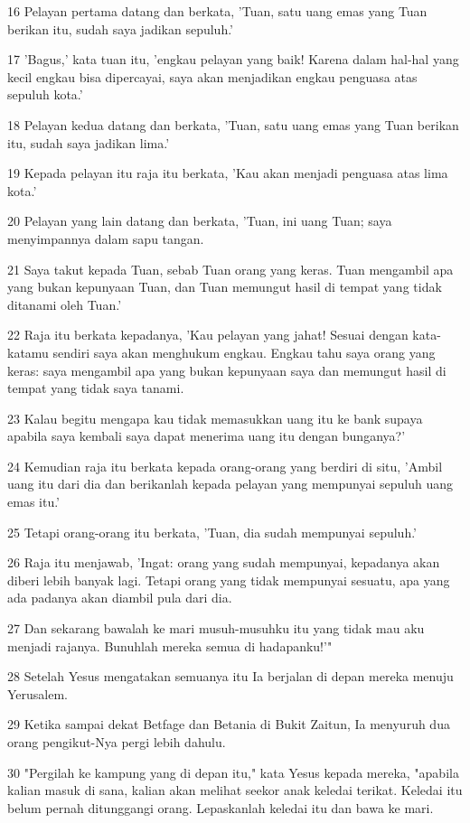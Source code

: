 \par 16 Pelayan pertama datang dan berkata, 'Tuan, satu uang emas yang Tuan berikan itu, sudah saya jadikan sepuluh.'
\par 17 'Bagus,' kata tuan itu, 'engkau pelayan yang baik! Karena dalam hal-hal yang kecil engkau bisa dipercayai, saya akan menjadikan engkau penguasa atas sepuluh kota.'
\par 18 Pelayan kedua datang dan berkata, 'Tuan, satu uang emas yang Tuan berikan itu, sudah saya jadikan lima.'
\par 19 Kepada pelayan itu raja itu berkata, 'Kau akan menjadi penguasa atas lima kota.'
\par 20 Pelayan yang lain datang dan berkata, 'Tuan, ini uang Tuan; saya menyimpannya dalam sapu tangan.
\par 21 Saya takut kepada Tuan, sebab Tuan orang yang keras. Tuan mengambil apa yang bukan kepunyaan Tuan, dan Tuan memungut hasil di tempat yang tidak ditanami oleh Tuan.'
\par 22 Raja itu berkata kepadanya, 'Kau pelayan yang jahat! Sesuai dengan kata-katamu sendiri saya akan menghukum engkau. Engkau tahu saya orang yang keras: saya mengambil apa yang bukan kepunyaan saya dan memungut hasil di tempat yang tidak saya tanami.
\par 23 Kalau begitu mengapa kau tidak memasukkan uang itu ke bank supaya apabila saya kembali saya dapat menerima uang itu dengan bunganya?'
\par 24 Kemudian raja itu berkata kepada orang-orang yang berdiri di situ, 'Ambil uang itu dari dia dan berikanlah kepada pelayan yang mempunyai sepuluh uang emas itu.'
\par 25 Tetapi orang-orang itu berkata, 'Tuan, dia sudah mempunyai sepuluh.'
\par 26 Raja itu menjawab, 'Ingat: orang yang sudah mempunyai, kepadanya akan diberi lebih banyak lagi. Tetapi orang yang tidak mempunyai sesuatu, apa yang ada padanya akan diambil pula dari dia.
\par 27 Dan sekarang bawalah ke mari musuh-musuhku itu yang tidak mau aku menjadi rajanya. Bunuhlah mereka semua di hadapanku!'"
\par 28 Setelah Yesus mengatakan semuanya itu Ia berjalan di depan mereka menuju Yerusalem.
\par 29 Ketika sampai dekat Betfage dan Betania di Bukit Zaitun, Ia menyuruh dua orang pengikut-Nya pergi lebih dahulu.
\par 30 "Pergilah ke kampung yang di depan itu," kata Yesus kepada mereka, "apabila kalian masuk di sana, kalian akan melihat seekor anak keledai terikat. Keledai itu belum pernah ditunggangi orang. Lepaskanlah keledai itu dan bawa ke mari.
